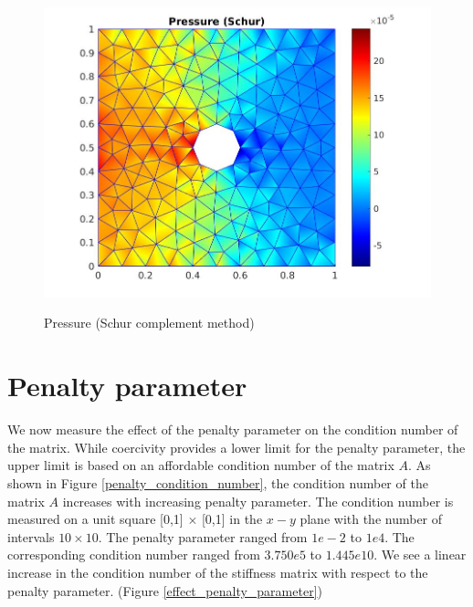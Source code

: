 \documentclass[a4paper]{book}
\begin{document}
\begin{figure}
\begin{minipage}[c]{0.3\textwidth}
     \label{y_vel_stoke_schur}
  \end{minipage}
  \begin{minipage}[c]{0.67\textwidth}
    \includegraphics[width=\textwidth]{cylinder_schur_pressure.jpg}
  \end{minipage}\hfill
  \begin{minipage}[c]{0.3\textwidth}
    \caption{Pressure (Schur complement method)}
      \label{pressure_stoke_schur}
  \end{minipage}
\caption{\label{flow_over_cylinder_schur}}
\end{figure}

\newpage

\section{Penalty parameter}

We now measure the effect of the penalty parameter on the condition number of the matrix. While coercivity provides a lower limit for the penalty parameter, the upper limit is based on an affordable condition number of the matrix $A$. As shown in Figure \ref{penalty_condition_number}, the condition number of the matrix $A$ increases with increasing penalty parameter.
The condition number is measured on a unit square [0,1] $\times$ [0,1] in the $x-y$ plane with the number of intervals $10 \times 10$. The penalty parameter ranged from $1e-2$ to $1e4$. The corresponding condition number ranged from $3.750e5$ to $1.445e10$. We see a linear increase in the condition number of the stiffness matrix with respect to the penalty parameter. (Figure \ref{effect_penalty_parameter})
\end{document}
